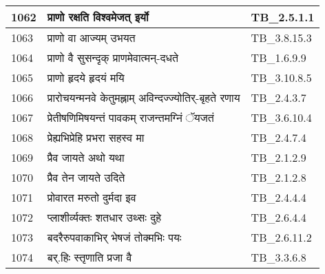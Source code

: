 \documentclass[17pt]{extarticle}
\begin{document}
\begin{longtable}{||p{0.4in}||p{4.9in}||p{0.9in}||}
    \hline
        
    1062 & प्राणो रक्षति विश्वमेजत् इर्यो & TB\_2.5.1.1       \\
    
    \hline
        
    1063 & प्राणो वा आज्यम् उभयत & TB\_3.8.15.3       \\
    
    \hline
        
    1064 & प्राणो वै सुसन्दृक् प्राणमेवात्मन्{-}दधते & TB\_1.6.9.9       \\
    
    \hline
        
    1065 & प्राणो हृदये हृदयं मयि & TB\_3.10.8.5       \\
    
    \hline
        
    1066 & प्रारोचयन्मनवे केतुमह्नाम् अविन्दज्ज्योतिर्{-}बृहते रणाय & TB\_2.4.3.7       \\
    
    \hline
        
    1067 & प्रेतीषणिमिषयन्तं पावकम् राजन्तमग्निं ॅयजतं & TB\_3.6.10.4       \\
    
    \hline
        
    1068 & प्रेह्यभिप्रेहि प्रभरा सहस्व मा & TB\_2.4.7.4       \\
    
    \hline
        
    1069 & प्रैव जायते अथो यथा & TB\_2.1.2.9       \\
    
    \hline
        
    1070 & प्रैव तेन जायते उदिते & TB\_2.1.2.8       \\
    
    \hline
        
    1071 & प्रोवारत मरुतो दुर्मदा इव & TB\_2.4.4.4       \\
    
    \hline
        
    1072 & प्लाशीर्व्यक्तः शतधार उथ्सः दुहे & TB\_2.6.4.4       \\
    
    \hline
        
    1073 & बदरैरुपवाकाभिर् भेषजं तोक्मभिः पयः & TB\_2.6.11.2       \\
    
    \hline
        
    1074 & बर्.हिः स्तृणाति प्रजा वै & TB\_3.3.6.8       \\
    

\end{longtable}
\end{document}
